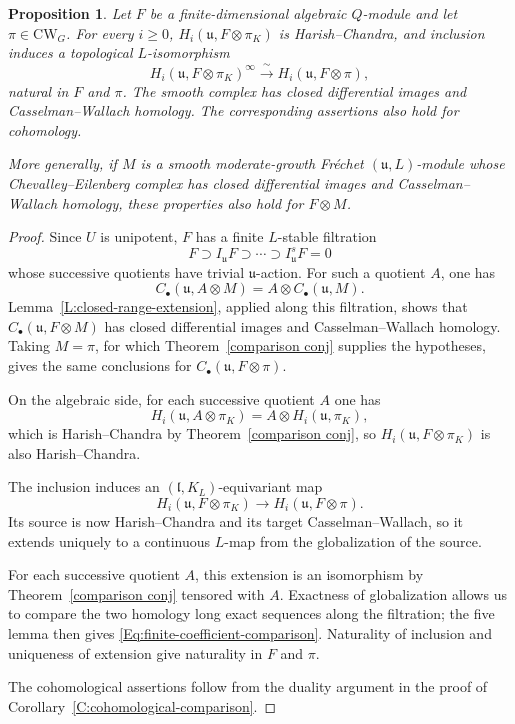 \documentclass[a4paper,12pt]{amsart}
\numberwithin{equation}{section}
\theoremstyle{plain}
\newtheorem{proposition}[theorem]{Proposition}
\theoremstyle{definition}
\theoremstyle{remark}
\begin{document}
\begin{proposition}\label{P:finite-coefficient-comparison}
Let $F$ be a finite-dimensional algebraic $Q$-module and let $\pi\in\mathrm{CW}_G$.
For every $i\geq0$, $H_i(\mathfrak u,F\otimes\pi_K)$ is Harish--Chandra, and inclusion induces a topological $L$-isomorphism
\begin{equation}\label{Eq:finite-coefficient-comparison}
 H_i(\mathfrak u,F\otimes\pi_K)^\infty
 \xrightarrow{\ \sim\ }H_i(\mathfrak u,F\otimes\pi),
\end{equation}
natural in $F$ and $\pi$.
The smooth complex has closed differential images and Casselman--Wallach homology.
The corresponding assertions also hold for cohomology.

More generally, if $M$ is a smooth moderate-growth Fr\'echet $(\mathfrak u,L)$-module whose Chevalley--Eilenberg complex has closed differential images and Casselman--Wallach homology, these properties also hold for $F\otimes M$.
\end{proposition}
\begin{proof}
Since $U$ is unipotent, $F$ has a finite $L$-stable filtration
\[
 F\supset I_{\mathfrak u}F\supset\cdots\supset I_{\mathfrak u}^sF=0
\]
whose successive quotients have trivial $\mathfrak u$-action.
For such a quotient $A$, one has
\[
 C_\bullet(\mathfrak u,A\otimes M)
 =A\otimes C_\bullet(\mathfrak u,M).
\]
Lemma~\ref{L:closed-range-extension}, applied along this filtration, shows that $C_\bullet(\mathfrak u,F\otimes M)$ has closed differential images and Casselman--Wallach homology.
Taking $M=\pi$, for which Theorem~\ref{comparison conj} supplies the hypotheses, gives the same conclusions for $C_\bullet(\mathfrak u,F\otimes\pi)$.

On the algebraic side, for each successive quotient $A$ one has
\[
 H_i(\mathfrak u,A\otimes\pi_K)
 =A\otimes H_i(\mathfrak u,\pi_K),
\]
which is Harish--Chandra by Theorem~\ref{comparison conj}, so $H_i(\mathfrak u,F\otimes\pi_K)$ is also Harish--Chandra.

The inclusion induces an $(\mathfrak l,K_L)$-equivariant map
\[
 H_i(\mathfrak u,F\otimes\pi_K)
 \longrightarrow H_i(\mathfrak u,F\otimes\pi).
\]
Its source is now Harish--Chandra and its target Casselman--Wallach, so it extends uniquely to a continuous $L$-map from the globalization of the source.

For each successive quotient $A$, this extension is an isomorphism by Theorem~\ref{comparison conj} tensored with $A$.
Exactness of globalization allows us to compare the two homology long exact sequences along the filtration; the five lemma then gives \eqref{Eq:finite-coefficient-comparison}.
Naturality of inclusion and uniqueness of extension give naturality in $F$ and $\pi$.

The cohomological assertions follow from the duality argument in the proof of Corollary~\ref{C:cohomological-comparison}.
\end{proof}
\end{document}
